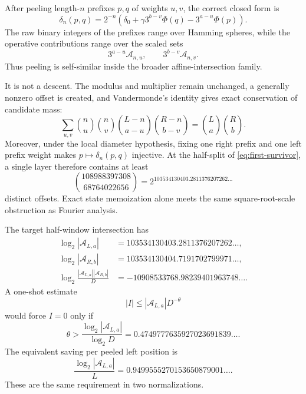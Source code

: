 \documentclass[11pt]{amsart}
\numberwithin{equation}{section}
\newcommand{\A}{\mathcal A}
\begin{document}
After peeling length-$n$ prefixes $p,q$ of weights $u,v$, the correct closed form is
\begin{equation}\label{eq:delta-n}
\delta_n(p,q)
=2^{-n}
\left(
\delta_0
+\gamma3^{b-v}\Phi(q)
-3^{a-u}\Phi(p)
\right).
\end{equation}
The raw binary integers of the prefixes range over Hamming spheres, while the operative contributions range over the scaled sets
\[
3^{a-u}\A_{n,u},
\qquad
3^{b-v}\A_{n,v}.
\]
Thus peeling is self-similar inside the broader affine-intersection family.

It is not a descent.  The modulus and multiplier remain unchanged, a generally nonzero offset is created, and Vandermonde's identity gives exact conservation of candidate mass:
\begin{equation}\label{eq:mass-conservation}
\sum_{u,v}
\binom nu\binom nv
\binom{L-n}{a-u}
\binom{R-n}{b-v}
=\binom La\binom Rb.
\end{equation}
Moreover, under the local diameter hypothesis, fixing one right prefix and one left prefix weight makes $p\mapsto\delta_n(p,q)$ injective.  At the half-split of \eqref{eq:first-survivor}, a single layer therefore contains at least
\begin{equation}\label{eq:offset-count}
\binom{108988397308}{68764022656}
=2^{103534130403.2811376207262\ldots}
\end{equation}
distinct offsets.  Exact state memoization alone meets the same square-root-scale obstruction as Fourier analysis.

The target half-window intersection has
\begin{align}
\log_2|\A_{L,a}|&=103534130403.2811376207262\ldots,\label{eq:exact-half-A}\\
\log_2|\A_{R,b}|&=103534130404.7191702799971\ldots,\label{eq:exact-half-B}\\
\log_2\frac{|\A_{L,a}||\A_{R,b}|}{D}
&=-10908533768.98239401963748\ldots.
\label{eq:expected-half-intersection}
\end{align}
A one-shot estimate
\[
|I|\le|\A_{L,a}|D^{-\theta}
\]
would force $I=0$ only if
\begin{equation}\label{eq:critical-theta}
\theta>
\frac{\log_2|\A_{L,a}|}{\log_2D}
=0.4749777635927023691839\ldots.
\end{equation}
The equivalent saving per peeled left position is
\begin{equation}\label{eq:critical-rate}
\frac{\log_2|\A_{L,a}|}{L}
=0.9499555270153650879001\ldots.
\end{equation}
These are the same requirement in two normalizations.
\end{document}

